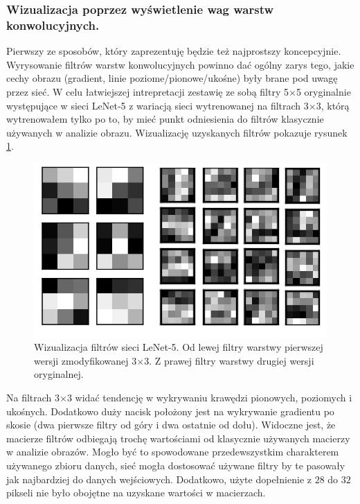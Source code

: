 \subsubsection{Wizualizacja poprzez wyświetlenie wag warstw konwolucyjnych.}
Pierwszy ze sposobów, który zaprezentuję będzie też najprostszy koncepcyjnie. Wyrysowanie filtrów warstw konwolucyjnych powinno dać ogólny zarys tego, jakie cechy obrazu (gradient, linie poziome/pionowe/ukośne) były brane pod uwagę przez sieć. W celu łatwiejszej intrepretacji zestawię ze sobą filtry 5\(\times\)5 oryginalnie występujące w sieci LeNet-5 z wariacją sieci wytrenowanej na filtrach 3\(\times\)3, którą wytrenowałem tylko po to, by mieć punkt odniesienia do filtrów
klasycznie używanych w analizie obrazu.
Wizualizację uzyskanych filtrów pokazuje rysunek \ref{fig:lenet5-response2}.

\begin{figure}[ht]
\centerline{\includegraphics[scale=0.5]{resources/plot_filtry.png}}
\caption{Wizualizacja filtrów sieci LeNet-5. Od lewej filtry warstwy pierwszej wersji zmodyfikowanej 3\(\times\)3. Z prawej filtry warstwy drugiej wersji oryginalnej.}
\label{fig:lenet5-response2}
\end{figure}

Na filtrach 3\(\times\)3 widać tendencję w wykrywaniu krawędzi pionowych, poziomych i ukośnych. Dodatkowo duży nacisk położony jest na wykrywanie gradientu po skosie (dwa pierwsze filtry od góry i dwa ostatnie od dołu).
Widoczne jest, że macierze filtrów odbiegają trochę wartościami od klasycznie używanych macierzy w analizie obrazów. Mogło być to spowodowane przedewszystkim charakterem używanego zbioru danych, sieć mogła dostosować używane filtry by te pasowały jak najbardziej do danych wejściowych. Dodatkowo, użyte dopełnienie z \(28\) do \(32\) pikseli nie było obojętne na uzyskane wartości w macierzach.


